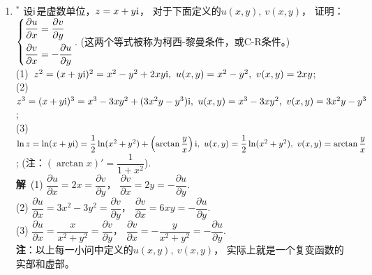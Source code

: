 \begin{enumerate}[label={【\textbf{例\thechapter.\arabic*}】},
 leftmargin=\inteval{\myenumleftmargin}pt,
 itemsep=\inteval{\myenumitempsep}pt,
 itemindent=\inteval{\myenumitemindent}pt]
\textbf{方法二}\ $ f(x)=x^4 + 6x^3 + 11x^2 + 6x,\ f'(x)=4x^3+18x^2+22x+6=
2(2x + 3)(x^2 + 3x + 1) $. 剩余步骤略。注意：$ f'(x) $的对称中心是
$ \left(-\dfrac{3}{2},0\right ) $，恰好在$ x $轴上。\\
\textbf{推广1}：若四次函数有4个实根$ x_1,x_2,x_3,x_4 $，
不妨设$ x_1\leq x_2\leq x_3\leq x_4 $. 
\begin{itemize}[itemsep=-1pt]
    \item 若$ x_1,x_2,x_3,x_4 $成等差数列，那么该函数存在对称轴
    $ x=\dfrac{x_1+x_4}{2}=\dfrac{x_2+x_3}{2} $. 
    \item 若$ x_1+x_4=x_2+x_3 $，那么该函数存在对称轴
    $ x=\dfrac{x_1+x_4}{2}=\dfrac{x_2+x_3}{2} $.
\end{itemize}
\textbf{推广2}：若四次函数的导函数的对称中心在$ x $轴上，
那么这个四次函数是轴对称图形，对称轴的横坐标就是导函数对称中心的横坐标。
从定积分的角度是很容易理解这一点的。

\item $^*$ 设$ \mathrm{i} $是虚数单位，$ z=x+y\mathrm{i} $，
对于下面定义的$ u(x,y),\ v(x,y) $，
证明：$ \begin{dcases}
    \dfrac{\partial u}{\partial x} =\dfrac{\partial v}{\partial y} \\
    \dfrac{\partial v}{\partial x} =-\dfrac{\partial u}{\partial y} 
\end{dcases} $. (这两个等式被称为柯西-黎曼条件，或C-R条件。)\\
(1)\ $ z^2=(x+y\i)^2=x^2-y^2+2xy\i,\ u(x,y)=x^2-y^2,\ v(x,y)=2xy $; \\
(2)\ $ z^3=(x+y\i)^3=x^3-3xy^2+(3x^2y-y^3)\i,\ u(x,y)=x^3-3xy^2,\ 
v(x,y)=3x^2y-y^3 $; \\
(3)\ $ \ln z=\ln(x+y\mathrm{i})=\dfrac{1}{2}\ln(x^2+y^2)+\left(\arctan\dfrac{y}{x}\right)\mathrm{i},
\ u(x,y)=\dfrac{1}{2}\ln(x^2+y^2),\ v(x,y)=\arctan\dfrac{y}{x} $; 
(注：$ (\arctan x)'=\dfrac{1}{1+x^2} $). \\
\textbf{解}\ (1) $ \dfrac{\partial u}{\partial x} =2x=
\dfrac{\partial v}{\partial y} $，
$ \dfrac{\partial v}{\partial x} =2y=
-\dfrac{\partial u}{\partial y} $. \\
(2) $ \dfrac{\partial u}{\partial x} =3x^2-3y^2=
\dfrac{\partial v}{\partial y} $，
$ \dfrac{\partial v}{\partial x} =6xy=
-\dfrac{\partial u}{\partial y} $. \\
(3) $ \dfrac{\partial u}{\partial x} =\dfrac{x}{x^2+y^2}=
\dfrac{\partial v}{\partial y} $，
$ \dfrac{\partial v}{\partial x} = -\dfrac{y}{x^2+y^2}=
-\dfrac{\partial u}{\partial y} $. \\
\textbf{注}：以上每一小问中定义的$ u(x,y),\ v(x,y) $，
实际上就是一个复变函数的实部和虚部。


\end{enumerate}
